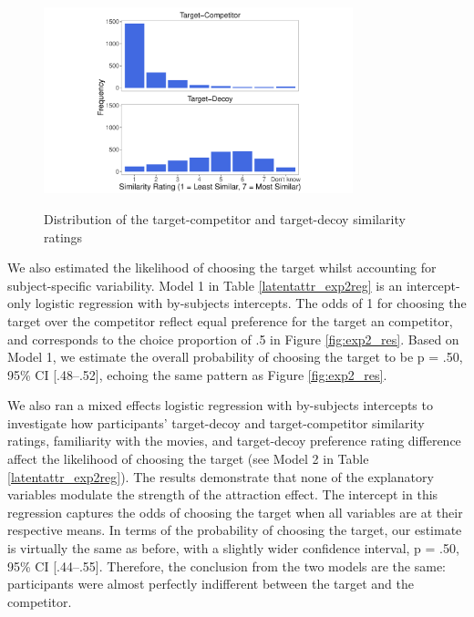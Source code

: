 \documentclass[12pt, a4paper]{article}
\begin{document}
\begin{figure}[htb!]
\centering
\captionsetup{justification=centering}
		\caption{Distribution of the target-competitor and target-decoy similarity ratings}
\includegraphics[width=0.8\textwidth]{figure5.pdf}
\label{fig:exp2_similarityratings}
\end{figure}

We also estimated the likelihood of choosing the target whilst accounting for subject-specific variability. Model 1 in Table \ref{latentattr_exp2reg} is an intercept-only logistic regression with by-subjects intercepts. The odds of 1 for choosing the target over the competitor reflect equal preference for the target an competitor, and corresponds to the choice proportion of .5 in Figure \ref{fig:exp2_res}. Based on Model 1, we estimate the overall probability of choosing the target to be p = .50, 95\% CI [.48--.52], echoing the same pattern as Figure \ref{fig:exp2_res}. 

We also ran a mixed effects logistic regression with by-subjects intercepts to investigate how participants' target-decoy and target-competitor similarity ratings, familiarity with the movies, and target-decoy preference rating difference affect the likelihood of choosing the target (see Model 2 in Table \ref{latentattr_exp2reg}). The results demonstrate that none of the explanatory variables modulate the strength of the attraction effect. The intercept in this regression captures the odds of choosing the target when all variables are at their respective means. In terms of the probability of choosing the target, our estimate is virtually the same as before, with a slightly wider confidence interval, p = .50, 95\% CI [.44--.55]. Therefore, the conclusion from the two models are the same: participants were almost perfectly indifferent between the target and the competitor. 
\end{document}
